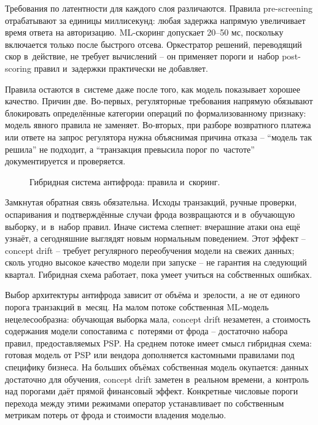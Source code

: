 Требования по латентности для каждого слоя различаются. Правила
pre-screening отрабатывают за единицы миллисекунд: любая задержка
напрямую увеличивает время ответа на авторизацию. ML-скоринг
допускает 20--50 мс, поскольку включается только после быстрого
отсева. Оркестратор решений, переводящий скор в~действие, не требует
вычислений -- он применяет пороги и~набор post-scoring правил
и~задержки практически не добавляет.

Правила остаются в~системе даже после того, как модель показывает
хорошее качество. Причин две. Во-первых, регуляторные требования
напрямую обязывают блокировать определённые категории операций по
формализованному признаку: модель явного правила не заменяет.
Во-вторых, при разборе возвратного платежа или ответе на запрос регулятора
нужна объяснимая причина отказа -- \enquote{модель так решила}
не подходит, а \enquote{транзакция превысила порог по~частоте}
документируется и проверяется.

\begin{figure}[tbp]
  \centering
  \caption{Гибридная система антифрода: правила и~скоринг.}\label{fig:fraud-hybrid}
\end{figure}

Замкнутая обратная связь обязательна. Исходы транзакций, ручные
проверки, оспаривания и подтверждённые случаи фрода возвращаются
и в~обучающую выборку, и~в~набор правил. Иначе система слепнет:
вчерашние атаки она ещё узнаёт, а сегодняшние выглядят новым
нормальным поведением. Этот эффект -- concept drift -- требует
регулярного переобучения модели на свежих данных; сколь угодно
высокое качество модели при запуске -- не гарантия на следующий
квартал. Гибридная схема работает, пока умеет учиться на собственных
ошибках.

Выбор архитектуры антифрода зависит от объёма и~зрелости, а~не от
единого порога транзакций в~месяц. На малом потоке собственная
ML-модель нецелесообразна: обучающая выборка мала, concept drift
незаметен, а стоимость содержания модели сопоставима с~потерями
от фрода -- достаточно набора правил, предоставляемых PSP. На среднем
потоке имеет смысл гибридная схема: готовая модель от PSP или вендора
дополняется кастомными правилами под специфику бизнеса. На больших
объёмах собственная модель окупается: данных достаточно для обучения,
concept drift заметен в~реальном времени, а~контроль над порогами
даёт прямой финансовый эффект. Конкретные числовые пороги перехода
между этими режимами оператор устанавливает по собственным метрикам
потерь от фрода и стоимости владения моделью.

